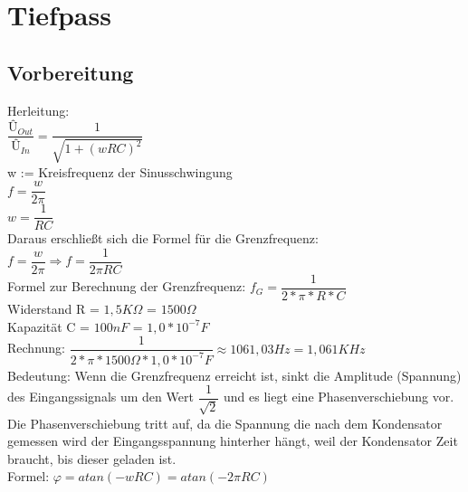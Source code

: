 \documentclass[paper=a4, fontsize=11pt]{scrartcl}
\numberwithin{equation}{section}
\numberwithin{figure}{section}
\numberwithin{table}{section}
\begin{document}

\newpage

\section{Tiefpass}

\subsection{Vorbereitung}

Herleitung: \\

$ \dfrac{Û_{Out}}{Û_{In}} = \dfrac{1}{\sqrt{1+(wRC)^{2}}}$ \\

w := Kreisfrequenz der Sinusschwingung \\

$f = \dfrac{w}{2 \pi}$ \\

$w = \dfrac{1}{RC}$ \\

Daraus erschließt sich die Formel für die Grenzfrequenz: \\

$f= \dfrac{w}{2 \pi} \Rightarrow f = \dfrac{1}{2 \pi R C}$ \\


Formel zur Berechnung der Grenzfrequenz: $f_{G} = \dfrac{1}{2* \pi * R * C}$ \\
Widerstand R = $1,5 K\Omega$ = $1500 \Omega$ \\
Kapazität C = $100 nF$ = $1,0 *10^{-7} F$ \\

Rechnung: $\dfrac{1}{2* \pi * 1500 \Omega *1,0*10^{-7} F} \approx 1061,03 Hz = 1,061 KHz$ \\

Bedeutung: Wenn die Grenzfrequenz erreicht ist, sinkt die Amplitude (Spannung) des Eingangssignals um den Wert $\dfrac{1}{\sqrt{2}}$ und es liegt eine Phasenverschiebung vor. \\

Die Phasenverschiebung tritt auf, da die Spannung die nach dem Kondensator gemessen wird der Eingangsspannung hinterher hängt, weil der Kondensator Zeit braucht, bis dieser geladen ist. \\

Formel: $\varphi = atan(-wRC) = atan(-2 \pi RC)$
\end{document}
